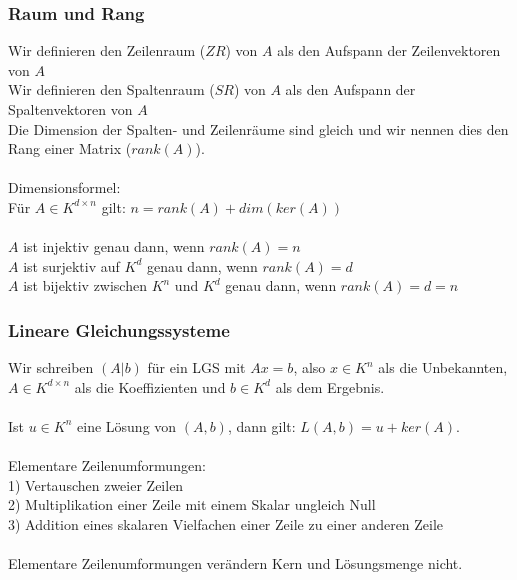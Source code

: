 \documentclass{article}
\begin{document}
\subsubsection*{Raum und Rang}
Wir definieren den Zeilenraum (\(ZR\)) von \(A\) als den Aufspann der Zeilenvektoren von \(A\)\\
Wir definieren den Spaltenraum (\(SR\)) von \(A\) als den Aufspann der Spaltenvektoren von \(A\)\\
Die Dimension der Spalten- und Zeilenräume sind gleich und wir nennen dies den Rang einer Matrix (\(rank(A)\)). \\ \\
Dimensionsformel: \\
Für \(A \in K^{d\times n}\) gilt: \(n = rank(A) + dim(ker(A))\) \\ \\
\(A\) ist injektiv genau dann, wenn \(rank(A) = n\) \\
\(A\) ist surjektiv auf \(K^d\) genau dann, wenn \(rank(A) = d\) \\
\(A\) ist bijektiv zwischen \(K^n\) und \(K^d\) genau dann, wenn \(rank(A) = d = n\)
\subsubsection*{Lineare Gleichungssysteme}
Wir schreiben \((A|b)\) für ein LGS mit \(Ax = b\), also \(x \in K^n\) als die Unbekannten, \(A \in K^{d \times n}\) als die Koeffizienten und \(b \in K^d\) als dem Ergebnis.\\ \\
Ist \(u \in K^n\) eine Lösung von \((A,b)\), dann gilt: \(L(A,b) = u + ker(A)\). \\ \\
Elementare Zeilenumformungen: \\
1) Vertauschen zweier Zeilen \\
2) Multiplikation einer Zeile mit einem Skalar ungleich Null \\
3) Addition eines skalaren Vielfachen einer Zeile zu einer anderen Zeile\\ \\
Elementare Zeilenumformungen verändern Kern und Lösungsmenge nicht. \\
\end{document}
